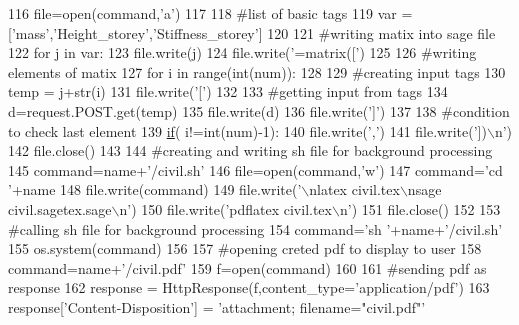 \begin{DoxyCode}
116         file=open(command,\textcolor{stringliteral}{'a'})
117 
118         \textcolor{comment}{#list of basic tags}
119         var = [\textcolor{stringliteral}{'mass'},\textcolor{stringliteral}{'Height\_storey'},\textcolor{stringliteral}{'Stiffness\_storey'}]
120 
121         \textcolor{comment}{#writing matix into sage file}
122         \textcolor{keywordflow}{for} j \textcolor{keywordflow}{in} var:
123             file.write(j)
124             file.write(\textcolor{stringliteral}{'=matrix(['})
125 
126             \textcolor{comment}{#writing elements of matix}
127             \textcolor{keywordflow}{for} i \textcolor{keywordflow}{in} range(int(num)):
128 
129                 \textcolor{comment}{#creating input tags}
130                 temp = j+str(i)
131                 file.write(\textcolor{stringliteral}{'['})
132 
133                 \textcolor{comment}{#getting input from tags}
134                 d=request.POST.get(temp)
135                 file.write(d)
136                 file.write(\textcolor{stringliteral}{']'})
137 
138                 \textcolor{comment}{#condition to check last element}
139                 \hyperlink{bootstrap_8min_8js_ac2d69f5011896c6ed4a54e0dd36f6334}{if}( i!=int(num)-1):
140                     file.write(\textcolor{stringliteral}{','})
141             file.write(\textcolor{stringliteral}{'])\(\backslash\)n'})
142         file.close()
143 
144         \textcolor{comment}{#creating and writing sh file for background processing}
145         command=name+\textcolor{stringliteral}{'/civil.sh'}
146         file=open(command,\textcolor{stringliteral}{'w'})
147         command=\textcolor{stringliteral}{'cd '}+name
148         file.write(command)
149         file.write(\textcolor{stringliteral}{'\(\backslash\)nlatex civil.tex\(\backslash\)nsage civil.sagetex.sage\(\backslash\)n'})
150         file.write(\textcolor{stringliteral}{'pdflatex civil.tex\(\backslash\)n'})
151         file.close()
152 
153         \textcolor{comment}{#calling sh file for background processing}
154         command=\textcolor{stringliteral}{'sh '}+name+\textcolor{stringliteral}{'/civil.sh'}
155         os.system(command)
156 
157         \textcolor{comment}{#opening creted pdf to display to user}
158         command=name+\textcolor{stringliteral}{'/civil.pdf'}
159         f=open(command)
160 
161         \textcolor{comment}{#sending pdf as response}
162         response = HttpResponse(f,content\_type=\textcolor{stringliteral}{'application/pdf'})
163         response[\textcolor{stringliteral}{'Content-Disposition'}] = \textcolor{stringliteral}{'attachment; filename="civil.pdf"'}

\end{DoxyCode}
